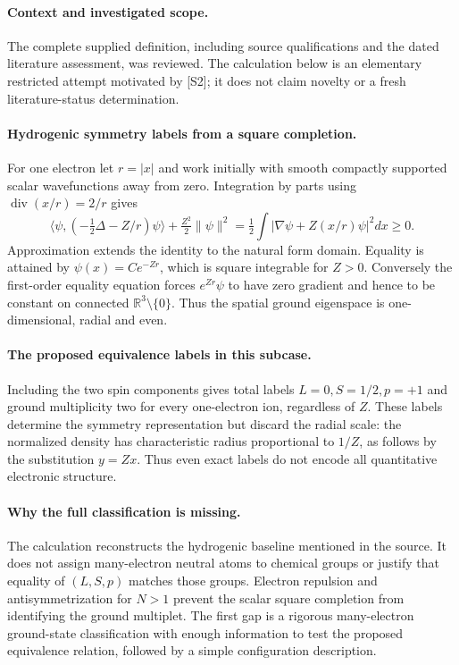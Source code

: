 \documentclass[11pt]{article}
\begin{document}
\paragraph{Context and investigated scope.} The complete supplied definition, including source qualifications and the dated literature assessment, was reviewed. The calculation below is an elementary restricted attempt motivated by [S2]; it does not claim novelty or a fresh literature-status determination.

\paragraph{Hydrogenic symmetry labels from a square completion.} For one electron let $r=|x|$ and work initially with smooth compactly supported scalar wavefunctions away from zero. Integration by parts using $\operatorname{div}(x/r)=2/r$ gives
\[
 \langle\psi,(-\tfrac12\Delta-Z/r)\psi\rangle
 +\tfrac{Z^2}{2}\|\psi\|^2
 =\tfrac12\int|\nabla\psi+Z(x/r)\psi|^2dx\geq0.
\]
Approximation extends the identity to the natural form domain. Equality is attained by $\psi(x)=Ce^{-Zr}$, which is square integrable for $Z>0$. Conversely the first-order equality equation forces $e^{Zr}\psi$ to have zero gradient and hence to be constant on connected $\mathbb R^3\setminus\{0\}$. Thus the spatial ground eigenspace is one-dimensional, radial and even.

\paragraph{The proposed equivalence labels in this subcase.} Including the two spin components gives total labels $L=0,S=1/2,p=+1$ and ground multiplicity two for every one-electron ion, regardless of $Z$. These labels determine the symmetry representation but discard the radial scale: the normalized density has characteristic radius proportional to $1/Z$, as follows by the substitution $y=Zx$. Thus even exact labels do not encode all quantitative electronic structure.

\paragraph{Why the full classification is missing.} The calculation reconstructs the hydrogenic baseline mentioned in the source. It does not assign many-electron neutral atoms to chemical groups or justify that equality of $(L,S,p)$ matches those groups. Electron repulsion and antisymmetrization for $N>1$ prevent the scalar square completion from identifying the ground multiplet. The first gap is a rigorous many-electron ground-state classification with enough information to test the proposed equivalence relation, followed by a simple configuration description.
\end{document}
